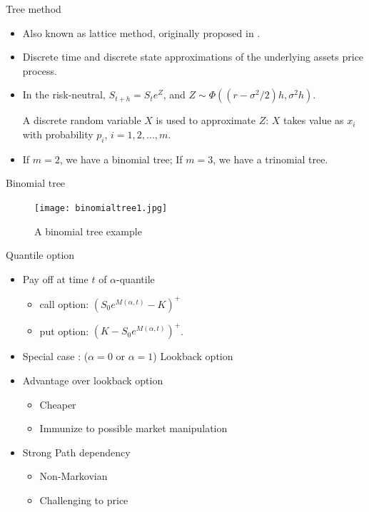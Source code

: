 \documentclass[cjk,10pt]{beamer}
\begin{document}
\begin{frame}{Tree method}
\begin{itemize}
\item
Also known as lattice method, originally proposed in \cite{cox1979}.
\item
Discrete time and discrete state approximations of the underlying assets price process.
\item
In the risk-neutral, $S_{t+h} = S_t e^{Z}$, and $Z\sim \Phi((r-\sigma ^2 /2)h,\sigma ^2 h)$. 

A discrete random variable $X$ is used to approximate $Z$: $X$ takes value as $x_i$ with probability $p_i$, $i=1,2,...,m$. 
\item
If $m=2$, we have a binomial tree; If $m=3$, we have a trinomial tree. 
\end{itemize}
\end{frame} 

\begin{frame}{Binomial tree}
\begin{figure}[p]
   \centering
   \texttt{[image: binomialtree1.jpg]} %
   \caption{A binomial tree example}
   \label{f:lerr3}
\end{figure}
\end{frame}

%
%


\begin{frame}{Quantile option}
\begin{itemize}
\item
Pay off at time $t$ of $\alpha$-quantile
\begin{itemize}
\item call option: $(S_0 e^{M(\alpha,t)} - K)^+$
\item put option: $(K - S_0 e^{M(\alpha,t)})^+$.
\end{itemize}
\item
Special case : ($\alpha=0$ or $\alpha=1$) Lookback option
\item
Advantage over lookback option
\begin{itemize}
\item
Cheaper
\item
Immunize to possible market manipulation 
\end{itemize}
\item
Strong Path dependency 
\begin{itemize}
\item
Non-Markovian 
\item
Challenging to price
\end{itemize}
\end{itemize}
\end{frame}
\end{document}
